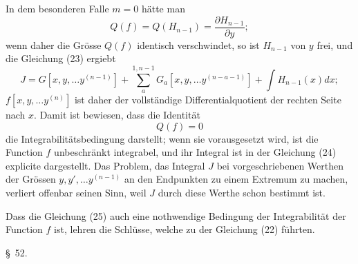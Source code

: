 \documentclass[11pt,a4paper,leqno]{article}
\begin{document}
In dem besonderen Falle $m=0$ hätte man
\[
Q(f)=Q(H_{n-1})=\frac{\partial H_{n-1}}{\partial y};
\]
wenn daher die Grösse $Q(f)$ identisch verschwindet, so ist $H_{n-1}$ von $y$ frei, und die Gleichung (23) ergiebt
\begin{equation}\tag{24}
J=G[x,y,\ldots y^{(n-1)}]+\sum_a^{1,n-1}G_a[x,y,\ldots y^{(n-a-1)}]
+\int H_{n-1}(x)dx;
\end{equation}
$f[x,y,\ldots y^{(n)}]$ ist daher der vollständige Differentialquotient der rechten Seite nach $x$. Damit ist bewiesen, dass die Identität
\begin{equation}\tag{25}
Q(f)=0
\end{equation}
die Integrabilitätsbedingung darstellt; wenn sie vorausgesetzt wird, ist die Function $f$ unbeschränkt integrabel, und ihr Integral ist in der Gleichung (24) explicite dargestellt. Das Problem, das Integral $J$ bei vorgeschriebenen Werthen der Grössen $y,y',\ldots y^{(n-1)}$ an den Endpunkten zu einem Extremum zu machen, verliert offenbar seinen Sinn, weil $J$ durch diese Werthe schon bestimmt ist.

Dass die Gleichung (25) auch eine nothwendige Bedingung der Integrabilität der Function $f$ ist, lehren die Schlüsse, welche zu der Gleichung (22) führten.

\begin{center}
{\large \S~52.}
\end{center}
\end{document}
